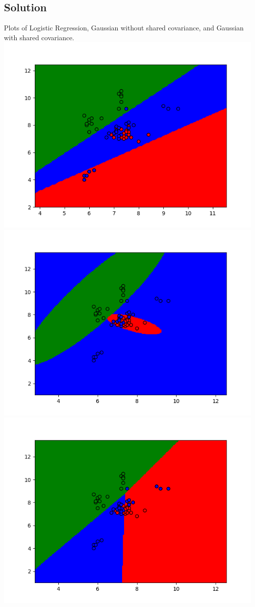 \documentclass[submit]{harvardml}
\begin{document}
\subsection{Solution}
Plots of Logistic Regression, Gaussian without shared covariance, and Gaussian
with shared covariance.
\includegraphics[scale=.5]{logistic_regression_result.png}
\includegraphics[scale=.5]{generative_result_separate_covariances.png}
\\
\includegraphics[scale=.5]{generative_result_shared_covariances.png}
\end{document}
